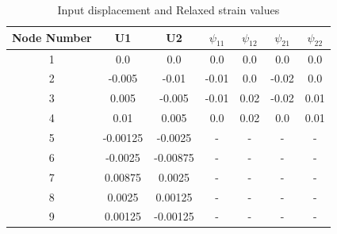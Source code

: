 \documentclass[12pt]{article}
\begin{document}
\begin{table}[H]
\begin{center}
	\begin{tabular}{||c c c c c c c||} 
		\hline
		Node Number & U1 & U2 & $\psi_{11}$ & $\psi_{12}$ & $\psi_{21}$ & $\psi_{22}$\\ [0.8ex] 
		\hline\hline
		1 & 0.0 & 0.0 & 0.0 & 0.0 & 0.0 & 0.0  \\ 
		[0.8ex]
		\hline
		2 & -0.005 & -0.01 & -0.01 & 0.0 & -0.02 & 0.0  \\ 
		[0.8ex]
		\hline
		3 & 0.005 & -0.005 & -0.01 & 0.02 & -0.02 & 0.01  \\ 
		[0.8ex]
		\hline
		4 & 0.01 & 0.005 & 0.0 & 0.02 & 0.0 & 0.01  \\ 
		[0.8ex]
		\hline
		5 & -0.00125 & -0.0025 & - & - & - & -  \\ 
		[0.8ex]
		\hline
		6 & -0.0025 & -0.00875 & - & - & - & - \\ 
		[0.8ex]
		\hline
		7 & 0.00875 & 0.0025 & - & - & - & - \\ 
		[0.8ex]
		\hline
		8 & 0.0025 & 0.00125 & - & - & - & - \\ 
		[0.8ex]
		\hline		
		9 & 0.00125 & -0.00125 & - & - & - & -\\  [0.8ex] 
		\hline
	\end{tabular}
	\caption{Input displacement and Relaxed strain values}
\end{center}
\end{table}
\newpage
\end{document}
